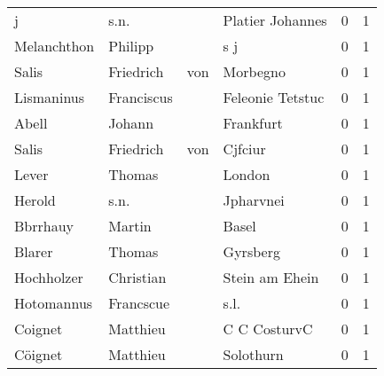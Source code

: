 \begin{center}
\begin{tiny}
\begin{longtabu}{llllrr}
                        j &                               s.n. &             &                            Platier Johannes &          0 &         1 \\
              Melanchthon &                            Philipp &             &                                         s j &          0 &         1 \\
                    Salis &                          Friedrich &         von &                                    Morbegno &          0 &         1 \\
               Lismaninus &                         Franciscus &             &                            Feleonie Tetstuc &          0 &         1 \\
                    Abell &                             Johann &             &                                   Frankfurt &          0 &         1 \\
                    Salis &                          Friedrich &         von &                                     Cjfciur &          0 &         1 \\
                    Lever &                             Thomas &             &                                      London &          0 &         1 \\
                   Herold &                               s.n. &             &                                   Jpharvnei &          0 &         1 \\
                 Bbrrhauy &                             Martin &             &                                       Basel &          0 &         1 \\
                   Blarer &                             Thomas &             &                                    Gyrsberg &          0 &         1 \\
               Hochholzer &                          Christian &             &                              Stein am Ehein &          0 &         1 \\
               Hotomannus &                          Francscue &             &                                        s.l. &          0 &         1 \\
                  Coignet &                           Matthieu &             &                                C C CosturvC &          0 &         1 \\
                  Cöignet &                           Matthieu &             &                                   Solothurn &          0 &         1 \\

\end{longtabu}
\end{tiny}
\end{center}
